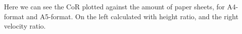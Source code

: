 \documentclass[preview]{standalone}
\begin{document}
\begin{center}
Here we can see the CoR plotted against the amount of paper sheets, for A4-format and A5-format. On the left calculated with height ratio, and the right velocity ratio.
\end{center}
\end{document}
